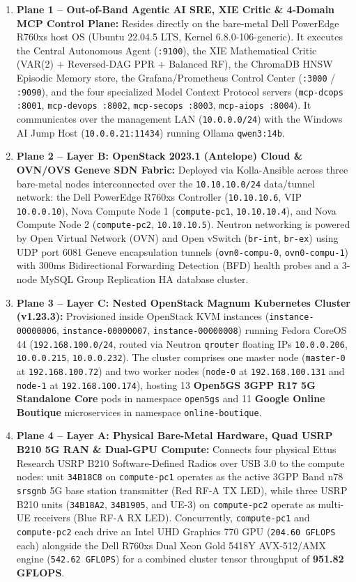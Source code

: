\begin{enumerate}
    \item \textbf{Plane 1 -- Out-of-Band Agentic AI SRE, XIE Critic \& 4-Domain MCP Control Plane:} Resides directly on the bare-metal Dell PowerEdge R760xs host OS (Ubuntu 22.04.5 LTS, Kernel 6.8.0-106-generic). It executes the Central Autonomous Agent (\texttt{:9100}), the XIE Mathematical Critic (VAR(2) + Reversed-DAG PPR + Balanced RF), the ChromaDB HNSW Episodic Memory store, the Grafana/Prometheus Control Center (\texttt{:3000} / \texttt{:9090}), and the four specialized Model Context Protocol servers (\texttt{mcp-dcops :8001}, \texttt{mcp-devops :8002}, \texttt{mcp-secops :8003}, \texttt{mcp-aiops :8004}). It communicates over the management LAN (\texttt{10.0.0.0/24}) with the Windows AI Jump Host (\texttt{10.0.0.21:11434}) running Ollama \texttt{qwen3:14b}.
    \item \textbf{Plane 2 -- Layer B: OpenStack 2023.1 (Antelope) Cloud \& OVN/OVS Geneve SDN Fabric:} Deployed via Kolla-Ansible across three bare-metal nodes interconnected over the \texttt{10.10.10.0/24} data/tunnel network: the Dell PowerEdge R760xs Controller (\texttt{10.10.10.6}, VIP \texttt{10.0.0.10}), Nova Compute Node 1 (\texttt{compute-pc1}, \texttt{10.10.10.4}), and Nova Compute Node 2 (\texttt{compute-pc2}, \texttt{10.10.10.5}). Neutron networking is powered by Open Virtual Network (OVN) and Open vSwitch (\texttt{br-int}, \texttt{br-ex}) using UDP port 6081 Geneve encapsulation tunnels (\texttt{ovn0-compu-0}, \texttt{ovn0-compu-1}) with 300ms Bidirectional Forwarding Detection (BFD) health probes and a 3-node MySQL Group Replication HA database cluster.
    \item \textbf{Plane 3 -- Layer C: Nested OpenStack Magnum Kubernetes Cluster (v1.23.3):} Provisioned inside OpenStack KVM instances (\texttt{instance-00000006}, \texttt{instance-00000007}, \texttt{instance-00000008}) running Fedora CoreOS 44 (\texttt{192.168.100.0/24}, routed via Neutron \texttt{qrouter} floating IPs \texttt{10.0.0.206}, \texttt{10.0.0.215}, \texttt{10.0.0.232}). The cluster comprises one master node (\texttt{master-0} at \texttt{192.168.100.72}) and two worker nodes (\texttt{node-0} at \texttt{192.168.100.131} and \texttt{node-1} at \texttt{192.168.100.174}), hosting 13 \textbf{Open5GS 3GPP R17 5G Standalone Core} pods in namespace \texttt{open5gs} and 11 \textbf{Google Online Boutique} microservices in namespace \texttt{online-boutique}.
    \item \textbf{Plane 4 -- Layer A: Physical Bare-Metal Hardware, Quad USRP B210 5G RAN \& Dual-GPU Compute:} Connects four physical Ettus Research USRP B210 Software-Defined Radios over USB 3.0 to the compute nodes: unit \texttt{34B18C8} on \texttt{compute-pc1} operates as the active 3GPP Band n78 \texttt{srsgnb} 5G base station transmitter (Red RF-A TX LED), while three USRP B210 units (\texttt{34B18A2}, \texttt{34B1905}, and UE-3) on \texttt{compute-pc2} operate as multi-UE receivers (Blue RF-A RX LED). Concurrently, \texttt{compute-pc1} and \texttt{compute-pc2} each drive an Intel UHD Graphics 770 GPU (\texttt{204.60 GFLOPS} each) alongside the Dell R760xs Dual Xeon Gold 5418Y AVX-512/AMX engine (\texttt{542.62 GFLOPS}) for a combined cluster tensor throughput of \textbf{951.82 GFLOPS}.

\end{enumerate}
